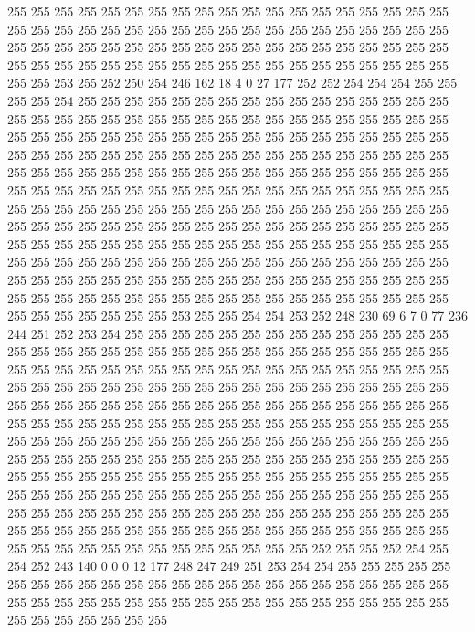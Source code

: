 255 255 255 255 255 255 255 255 255 255 255 255 255 255 255 255 255 255 255 255
255 255 255 255 255 255 255 255 255 255 255 255 255 255 255 255 255 255 255 255
255 255 255 255 255 255 255 255 255 255 255 255 255 255 255 255 255 255 255 255
255 255 255 255 255 255 255 255 255 255 255 255 255 255 255 255 255 255 253 255
252 250 254 246 162 18 4 0 27 177 252 252 254 254 254 255 255 255 255 254
255 255 255 255 255 255 255 255 255 255 255 255 255 255 255 255 255 255 255 255
255 255 255 255 255 255 255 255 255 255 255 255 255 255 255 255 255 255 255 255
255 255 255 255 255 255 255 255 255 255 255 255 255 255 255 255 255 255 255 255
255 255 255 255 255 255 255 255 255 255 255 255 255 255 255 255 255 255 255 255
255 255 255 255 255 255 255 255 255 255 255 255 255 255 255 255 255 255 255 255
255 255 255 255 255 255 255 255 255 255 255 255 255 255 255 255 255 255 255 255
255 255 255 255 255 255 255 255 255 255 255 255 255 255 255 255 255 255 255 255
255 255 255 255 255 255 255 255 255 255 255 255 255 255 255 255 255 255 255 255
255 255 255 255 255 255 255 255 255 255 255 255 255 255 255 255 255 255 255 255
255 255 255 255 255 255 255 255 255 255 255 255 255 255 255 255 255 255 255 255
255 255 255 255 255 255 255 255 255 255 255 255 255 255 255 255 255 255 255 255
255 255 255 255 255 255 255 255 255 255 255 255 253 255 255 254 254 253 252 248
230 69 6 7 0 77 236 244 251 252 253 254 255 255 255 255 255 255 255 255
255 255 255 255 255 255 255 255 255 255 255 255 255 255 255 255 255 255 255 255
255 255 255 255 255 255 255 255 255 255 255 255 255 255 255 255 255 255 255 255
255 255 255 255 255 255 255 255 255 255 255 255 255 255 255 255 255 255 255 255
255 255 255 255 255 255 255 255 255 255 255 255 255 255 255 255 255 255 255 255
255 255 255 255 255 255 255 255 255 255 255 255 255 255 255 255 255 255 255 255
255 255 255 255 255 255 255 255 255 255 255 255 255 255 255 255 255 255 255 255
255 255 255 255 255 255 255 255 255 255 255 255 255 255 255 255 255 255 255 255
255 255 255 255 255 255 255 255 255 255 255 255 255 255 255 255 255 255 255 255
255 255 255 255 255 255 255 255 255 255 255 255 255 255 255 255 255 255 255 255
255 255 255 255 255 255 255 255 255 255 255 255 255 255 255 255 255 255 255 255
255 255 255 255 255 255 255 255 255 255 255 255 255 255 255 255 255 255 255 255
255 255 255 255 255 255 255 255 252 255 255 252 254 255 254 252 243 140 0 0
0 12 177 248 247 249 251 253 254 254 255 255 255 255 255 255 255 255 255 255
255 255 255 255 255 255 255 255 255 255 255 255 255 255 255 255 255 255 255 255
255 255 255 255 255 255 255 255 255 255 255 255 255 255 255 255 255 255 255 255
